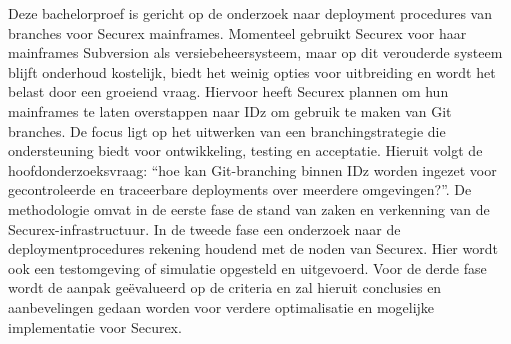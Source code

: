 Deze bachelorproef is gericht op de onderzoek naar deployment procedures van branches voor Securex mainframes. Momenteel gebruikt Securex voor haar mainframes Subversion als versiebeheersysteem, maar op dit verouderde systeem blijft onderhoud kostelijk, biedt het weinig opties voor uitbreiding en wordt het belast door een groeiend vraag. Hiervoor heeft Securex plannen om hun mainframes te laten overstappen naar IDz om gebruik te maken van Git branches. De focus ligt op het uitwerken van een branchingstrategie die ondersteuning biedt voor ontwikkeling, testing en acceptatie. Hieruit volgt de hoofdonderzoeksvraag: ``hoe kan Git-branching binnen IDz worden ingezet voor gecontroleerde en traceerbare deployments over meerdere omgevingen?''. De methodologie omvat in de eerste fase de stand van zaken en verkenning van de Securex-infrastructuur. In de tweede fase een onderzoek naar de deploymentprocedures rekening houdend met de noden van Securex. Hier wordt ook een testomgeving of simulatie opgesteld en uitgevoerd. Voor de derde fase wordt de aanpak geëvalueerd op de criteria en zal hieruit conclusies en aanbevelingen gedaan worden voor verdere optimalisatie en mogelijke implementatie voor Securex.
